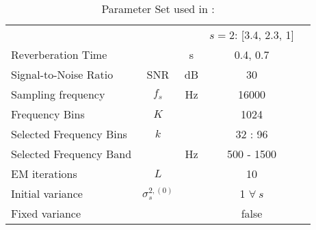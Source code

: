 \begin{table}[htb]
\begin{tabular}{lcccc}
		                               &                     &      & $s=2$: [3.4, 2.3, 1]     \\%
		Reverberation Time             & \Tsixty             & s    & 0.4, 0.7                 \\%
		Signal-to-Noise Ratio          & SNR                 & dB   & 30                       \\%
		Sampling frequency             & $f_s$               & Hz   & 16000                    \\%
		\glsentryshort{stft} Frequency Bins      & $K$                 &      & 1024                     \\%
		Selected Frequency Bins        & $k$                 &      & 32 : 96                  \\%
		Selected Frequency Band        &                     & Hz   & 500 - 1500               \\%
		EM iterations                  & $L$                 &      & 10                       \\%
		Initial variance               & $\sigma^{2, (0)}_s$ &      & 1 $\forall\ s$           \\%
		Fixed variance                 &                     &      & false                    \\%
		\bottomrule
	\end{tabular}
	\label{table:parameters-schwartz14}
	\caption[Parameter Set used in \cite{Schwartz2014}]{Parameter Set used in \cite{Schwartz2014}: \itshape }
\end{table}